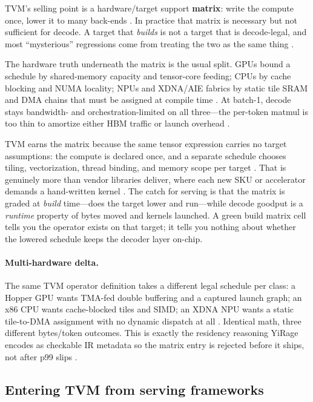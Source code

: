 TVM's selling point is a hardware/target support \textbf{matrix}: write the compute once, lower it to many back-ends \citep{chen2018tvm}. In practice that matrix is necessary but not sufficient for decode. A target that \emph{builds} is not a target that is decode-legal, and most ``mysterious'' regressions come from treating the two as the same thing \citep{taxbreak2026,patel2025llminference}.

The hardware truth underneath the matrix is the usual split. GPUs bound a schedule by shared-memory capacity and tensor-core feeding; CPUs by cache blocking and NUMA locality; NPUs and XDNA/AIE fabrics by static tile SRAM and DMA chains that must be assigned at compile time \citep{nvidia2022hopper,amd2024xdna,dlbook}. At batch-1, decode stays bandwidth- and orchestration-limited on all three---the per-token matmul is too thin to amortize either HBM traffic or launch overhead \citep{memoryfloor2026,taxbreak2026}.

TVM earns the matrix because the same tensor expression carries no target assumptions: the compute is declared once, and a separate schedule chooses tiling, vectorization, thread binding, and memory scope per target \citep{chen2018tvm}. That is genuinely more than vendor libraries deliver, where each new SKU or accelerator demands a hand-written kernel \citep{chen2020compilerbasedhardw}. The catch for serving is that the matrix is graded at \emph{build} time---does the target lower and run---while decode goodput is a \emph{runtime} property of bytes moved and kernels launched. A green build matrix cell tells you the operator exists on that target; it tells you nothing about whether the lowered schedule keeps the decoder layer on-chip.

\paragraph{Multi-hardware delta.} The same TVM operator definition takes a different legal schedule per class: a Hopper GPU wants TMA-fed double buffering and a captured launch graph; an x86 CPU wants cache-blocked tiles and SIMD; an XDNA NPU wants a static tile-to-DMA assignment with no dynamic dispatch at all \citep{semianalysis2024tma,amd2024xdna,amd2024aie}. Identical math, three different bytes/token outcomes. This is exactly the residency reasoning YiRage encodes as checkable IR metadata so the matrix entry is rejected before it ships, not after p99 slips \citep{yirage2026}.

\subsection{Entering TVM from serving frameworks}

